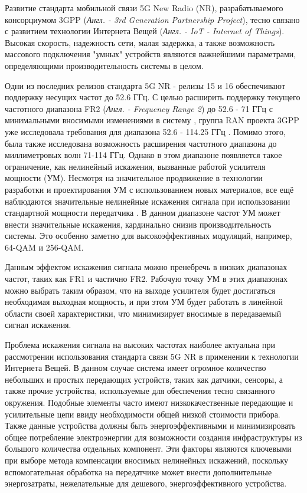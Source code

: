 \Introduction

Развитие стандарта мобильной связи 5G New Radio (NR), разрабатываемого консорциумом
3GPP (\textit{Англ. - 3rd Generation Partnership Project}), тесно связано с развитием
технологии Интернета Вещей (\textit{Англ. - IoT - Internet of Things}). Высокая скорость,
надежность сети, малая задержка, а также возможность массового подключения
"умных" устройств являются важнейшими параметрами, определяющими
производительность системы в целом.

Одни из последних релизов стандарта 5G NR - релизы 15 и 16 обеспечивают
поддержку несущих частот до 52.6 ГГц. С целью расширить поддержку текущего
частотного диапазона FR2 (\textit{Англ. - Frequency Range 2}) до 52.6 - 71 ГГц с
минимальными вносимыми изменениями в систему \cite{intel193259}
\cite{qlcm193229}, группа RAN проекта 3GPP уже исследовала требования для
диапазона 52.6 - 114.25 ГГц \cite{3gpp.38.807}. Помимо этого, была также
исследована возможность расширения частотного диапазона до миллиметровых
волн 71-114 ГГц. Однако в этом диапазоне появляется такое ограничение, как
нелинейный искажения, вызванные работой усилителя мощности (УМ). Несмотря
на значительное продвижение в технологии разработки и проектирования УМ с
использованием новых материалов, все ещё наблюдаются значительные нелинейные
искажения сигнала при использовании стандартной мощности передатчика
\cite{zhang2021}. В данном диапазоне частот УМ может внести значительные
искажения, кардинально снизив производительность
системы. Это особенно заметно для высокоэффективных модуляций, например,
64-QAM и 256-QAM.

Данным эффектом искажения сигнала можно пренебречь в низких диапазонах
частот, таких как FR1 и частично FR2. Рабочую точку УМ в этих диапазонах
можно выбрать таким образом, что на выходе усилителя будет достигаться
необходимая выходная мощность, и при этом УМ будет работать в линейной
области своей характеристики, что минимизирует вносимые в передаваемый
сигнал искажения.

Проблема искажения сигнала на высоких частотах наиболее актуальна при
рассмотрении использования стандарта связи 5G NR в применении к технологии
Интернета Вещей. В данном случае система имеет огромное количество
небольших и простых передающих устройств, таких как датчики, сенсоры, а
также прочие устройства, используемые для обеспечения тесно
связанного окружения. Подобные элементы часто имеют низкокачественные
передающие и усилительные цепи ввиду необходимости общей низкой стоимости
прибора. Также данные устройства должны быть энергоэффективными и
минимизировать общее потребление электроэнергии для возможности создания
инфраструктуры из большого количества отдельных компонент.
Эти факторы являются ключевыми при выборе метода компенсации вносимых
нелинейных искажений, поскольку вспомогательная обработка на передатчике
может внести дополнительные энергозатраты, нежелательные для дешевого,
энергоэффективного устройства.

